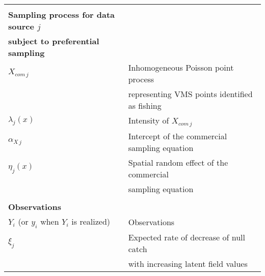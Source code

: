 \begin{center}
\begin{longtable}{ll}
                                  &                                                                                                                                         \\
\textbf{Sampling process for data source \(j\)}  & \\                                                                                                                                         \textbf{subject to preferential sampling} &                                                                                                                                         \\
\(X_{com \, j}\)                  & Inhomogeneous Poisson point process \\
                                  & representing VMS points identified as fishing                                                       
\\
\(\lambda_j(x)\)                  & Intensity of \(X_{com \, j}\)                                                                                                                             \\
\(\alpha_{X \, j}\)               & Intercept of the commercial sampling equation                                                                                           \\
\(\eta_j(x)\)                     & Spatial random effect of the commercial \\
                                  & sampling equation                                                                               \\
                                  &                                                                                                                                         \\
\textbf{Observations}             &                                                                                                                                         \\
\(Y_i\) (or \(y_i\) when \(Y_i\) 
is realized)                      & Observations                                                                                                                            
\\
\(\xi_j\)                         & Expected rate of decrease of null catch \\
                                  & with increasing latent field values                                                             

\end{longtable}
\end{center}
